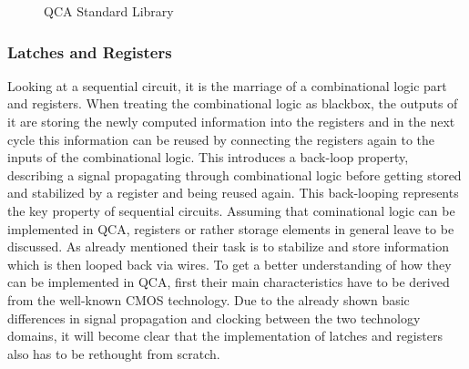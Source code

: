 \begin{figure}
{
}
	\caption{QCA Standard Library}\label{fig:StandardCellLibrary}
\end{figure}

\subsubsection{Latches and Registers}\label{subsec:latchesandregisters}
Looking at a sequential circuit, it is the marriage of a combinational logic part and registers. When treating the combinational logic as blackbox, the outputs of it are storing the newly computed information into the registers and in the next cycle this information can be reused by connecting the registers again to the inputs of the combinational logic. This introduces a back-loop property, describing a signal propagating through combinational logic before getting stored and stabilized by a register and being reused again. This back-looping represents the key property of sequential circuits.
Assuming that cominational logic can be implemented in QCA, registers or rather storage elements in general leave to be discussed. As already mentioned their task is to stabilize and store information which is then looped back via wires. To get a better understanding of how they can be implemented in QCA, first their main characteristics have to be derived from the well-known CMOS technology. Due to the already shown basic differences in signal propagation and clocking between the two technology domains, it will become clear that the implementation of latches and registers also has to be rethought from scratch.

